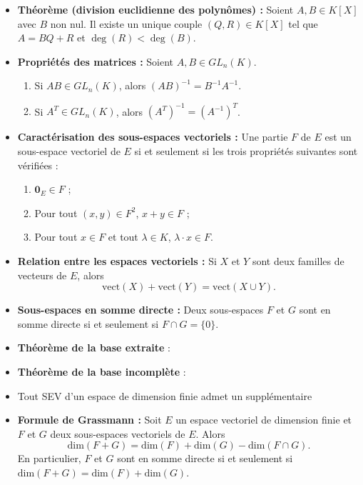 \documentclass{article}
\begin{document}
\begin{itemize}[label=$\ast$]
	\item \textbf{Théorème (division euclidienne des polynômes) :} Soient \( A, B \in K[X] \) avec \( B \) non nul. Il existe un unique couple \( (Q, R) \in K[X] \) tel que \( A = BQ + R \) et \( \deg(R) < \deg(B) \).
	\item \textbf{Propriétés des matrices :} Soient \( A, B \in GL_n(K) \).
\begin{enumerate}
    \item Si \( AB \in GL_n(K) \), alors \( (AB)^{-1} = B^{-1}A^{-1} \).
    \item Si \( A^T \in GL_n(K) \), alors \( (A^T)^{-1} = (A^{-1})^T \).
\end{enumerate}

\item \textbf{Caractérisation des sous-espaces vectoriels :} Une partie \( F \) de \( E \) est un sous-espace vectoriel de \( E \) si et seulement si les trois propriétés suivantes sont vérifiées :
\begin{enumerate}
    \item \( \mathbf{0}_E \in F \) ;
    \item Pour tout \( (x, y) \in F^2 \), \( x + y \in F \) ;
    \item Pour tout \( x \in F \) et tout \( \lambda \in K \), \( \lambda \cdot x \in F \).
\end{enumerate}

\item \textbf{Relation entre les espaces vectoriels :} Si \(X\) et \(Y\) sont deux familles de vecteurs de \(E\), alors \[ \text{vect}(X) + \text{vect}(Y) = \text{vect}(X \cup Y). \]

\item \textbf{Sous-espaces en somme directe :} Deux sous-espaces \(F\) et \(G\) sont en somme directe si et seulement si \(F \cap G = \{0\}\).

\item \textbf{Théorème de la base extraite} :
\item \textbf{Théorème de la base incomplète} : 
\item Tout SEV d'un espace de dimension finie admet un supplémentaire

\item \textbf{Formule de Grassmann :} Soit \(E\) un espace vectoriel de dimension finie et \(F\) et \(G\) deux sous-espaces vectoriels de \(E\). Alors \[ \text{dim}(F + G) = \text{dim}(F) + \text{dim}(G) - \text{dim}(F \cap G). \] En particulier, \(F\) et \(G\) sont en somme directe si et seulement si \(\text{dim}(F + G) = \text{dim}(F) + \text{dim}(G)\).


\end{itemize}
\end{document}

